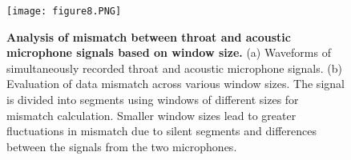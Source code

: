 \documentclass[10pt]{wlscirep}
\begin{document}
\begin{figure}[ht]
\centering
\texttt{[image: figure8.PNG]}

\caption{\textbf{Analysis of mismatch between throat and acoustic microphone signals based on window size.} (a) Waveforms of simultaneously recorded throat and acoustic microphone signals. (b) Evaluation of data mismatch across various window sizes. The signal is divided into segments using windows of different sizes for mismatch calculation. Smaller window sizes lead to greater fluctuations in mismatch due to silent segments and differences between the signals from the two microphones.
}
\label{fig:8}
\end{figure}
\end{document}
